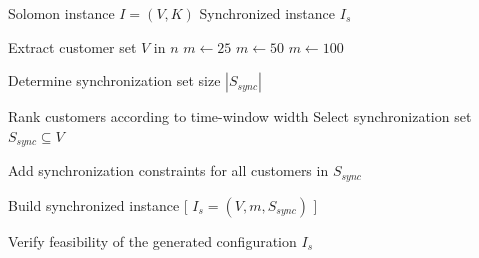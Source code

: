 \documentclass{article}
\begin{document}
\begin{algorithm}[H]
\caption{Generation of synchronized VRPTW-S instances}
\begin{algorithmic}[1]

\Require Solomon instance $I=(V,K)$
\Ensure Synchronized instance $I_s$

\State Extract customer set $V$ in $n$
\State $m \gets 25$
\State $m \gets 50$
\Else
\State $m \gets 100$
\EndIf
\State \phantom{}

\State Determine synchronization set size $|S_{sync}|$
\State \phantom{}

\State Rank customers according to time-window width
\State Select synchronization set $S_{sync}\subseteq V$
\State \phantom{}

\State Add synchronization constraints for all customers in $S_{sync}$
\State \phantom{}

\State Build synchronized instance
[
$I_s=(V,m,S_{sync})$
]
\State \phantom{}

\State Verify feasibility of the generated configuration
\State \Return $I_s$

\end{algorithmic}
\end{algorithm}
\end{document}
